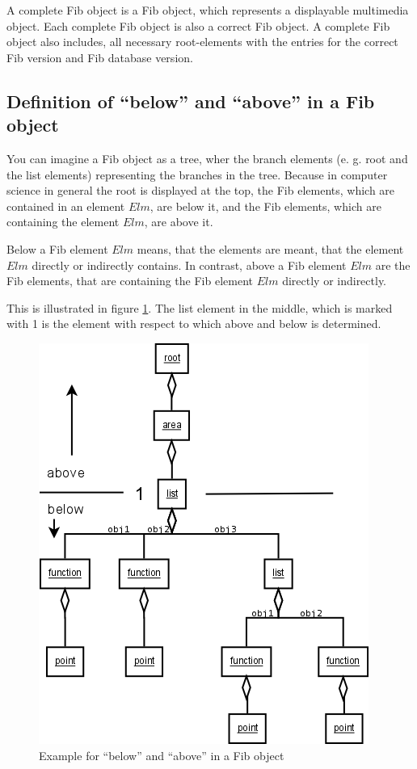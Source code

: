 A complete Fib object is a Fib object, which represents a displayable multimedia object. Each complete Fib object is also a correct Fib object. A complete Fib object also includes, all necessary root-elements with the entries for the correct Fib version and Fib database version.


\subsection{Definition of ``below'' and ``above'' in a Fib object}
\label{secDefinitionUpDown}

You can imagine a Fib object as a tree, wher the branch elements (e. g. root and the list elements) representing the branches in the tree.
Because in computer science in general the root is displayed at the top, the Fib elements, which are contained in an element $Elm$, are below it, and the Fib elements, which are containing the element $Elm$, are above it.

Below a Fib element $Elm$ means, that the elements are meant, that the element $Elm$ directly or indirectly contains.
In contrast, above a Fib element $Elm$ are the Fib elements, that are containing the Fib element $Elm$ directly or indirectly.

This is illustrated in figure \ref{figDirectionFibElements}. The list element in the middle, which is marked with 1 is the element with respect to which above and below is determined.

\begin{figure}[htbp]
\begin{center}
  \includegraphics[scale=0.5]{above_below}
\end{center}
\caption{Example for ``below'' and ``above'' in a Fib object}
\label{figDirectionFibElements}
\end{figure}


